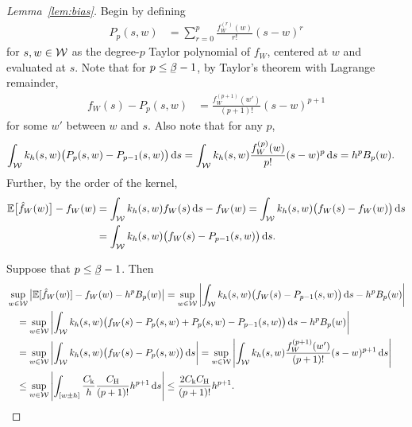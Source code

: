 \begin{proof}[Lemma~\ref{lem:bias}]

  Begin by defining
  \begin{align*}
    P_p(s,w)
    &=
    \sum_{r = 0}^p
    \frac{f_W^{(r)}(w)}{r!}
    {(s-w)^r}
  \end{align*}
  for $s, w \in \mathcal{W}$
  as the degree-$p$ Taylor polynomial of $f_W$,
  centered at $w$ and evaluated at $s$.
  Note that
  for $p \leq \flbeta-1$,
  by Taylor's theorem with Lagrange remainder,
  \begin{align*}
    f_W(s) - P_p(s,w)
    &=
    \frac{f_W^{(p+1)}(w')}{(p+1)!}
    (s-w)^{p+1}
  \end{align*}
  for some $w'$ between $w$ and $s$.
  Also note that for any $p$,
  \begin{align*}
    \int_{\mathcal{W}}
    k_h(s,w)
    \big(
    P_p(s,w)
    - P_{p-1}(s,w)
    \big)
    \,\mathrm{d}s
    &=
    \int_{\mathcal{W}}
    k_h(s,w)
    \frac{f_W^{(p)}(w)}{p!}
    (s-w)^p
    \,\mathrm{d}s
    = h^p B_p(w).
  \end{align*}
  Further, by the order of the kernel,
  \begin{align*}
    \mathbb{E}\big[\hat f_W(w)\big]
    - f_W(w)
    &=
    \int_{\mathcal{W}}
    k_h(s,w)
    f_W(s)
    \,\mathrm{d}s
    - f_W(w)
    =
    \int_{\mathcal{W}}
    k_h(s,w)
    \big(f_W(s) - f_W(w)\big)
    \,\mathrm{d}s \\
    &=
    \int_{\mathcal{W}}
    k_h(s,w)
    \big(f_W(s) - P_{p-1}(s,w)\big)
    \,\mathrm{d}s.
  \end{align*}

  Suppose that $p \leq \flbeta - 1$.
  Then
  \begin{align*}
    &\sup_{w \in \mathcal{W}}
    \big|
    \mathbb{E}[\hat f_W(w)]
    - f_W(w)
    - h^p B_p(w)
    \big|
    =
    \sup_{w \in \mathcal{W}}
    \left|
    \int_{\mathcal{W}}
    k_h(s,w)
    \big(f_W(s) - P_{p-1}(s,w)\big)
    \,\mathrm{d}s
    - h^p B_p(w)
    \right| \\
    &\quad=
    \sup_{w \in \mathcal{W}}
    \left|
    \int_{\mathcal{W}}
    k_h(s,w)
    \big(
    f_W(s) - P_{p}(s,w)
    + P_{p}(s,w) - P_{p-1}(s,w)
    \big)
    \,\mathrm{d}s
    - h^p B_p(w)
    \right| \\
    &\quad=
    \sup_{w \in \mathcal{W}}
    \left|
    \int_{\mathcal{W}}
    k_h(s,w)
    \big(
    f_W(s) - P_{p}(s,w)
    \big)
    \,\mathrm{d}s
    \right|
    =
    \sup_{w \in \mathcal{W}}
    \left|
    \int_{\mathcal{W}}
    k_h(s,w)
    \frac{f_W^{(p+1)}(w')}{(p+1)!}
    (s-w)^{p+1}
    \,\mathrm{d}s
    \right| \\
    &\quad\leq
    \sup_{w \in \mathcal{W}}
    \left|
    \int_{[w \pm h]}
    \frac{C_\mathrm{k}}{h}
    \frac{C_\mathrm{H}}{(p+1)!}
    h^{p+1}
    \,\mathrm{d}s
    \right|
    \leq
    \frac{2C_\mathrm{k} C_\mathrm{H}}{(p+1)!}
    h^{p+1}.
  \end{align*}


\end{proof}
